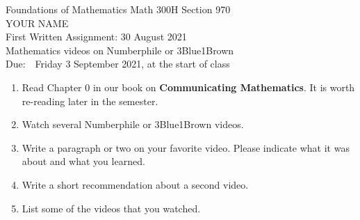 \documentclass[12pt]{article}
\begin{document}
\LARGE 
\noindent
{\color{Maroon}Foundations of Mathematics \hfill Math 300H Section 970}\vspace{2pt}\\
\Large YOUR NAME\vspace{2pt}\\
\large
First Written Assignment: \hfill 30 August 2021\\
Mathematics videos on Numberphile or 3{\color{blue}Blue}1{\color{brown}Brown}\\
Due:\ \ Friday 3 September 2021, at the start of class\vspace{20pt}
\normalsize

\begin{enumerate}

\item  Read Chapter 0 in our book on {\bf Communicating Mathematics}.  It is worth re-reading later in the semester.

\item  Watch several Numberphile or 3{\color{blue}Blue}1{\color{brown}Brown} videos.
   
\item     Write a paragraph or two on your favorite video.
  Please indicate what it was about and what you learned.


  \item   Write a short recommendation about a second video.

    
  \item   List some of the videos that you watched.


\end{enumerate}
\end{document}
